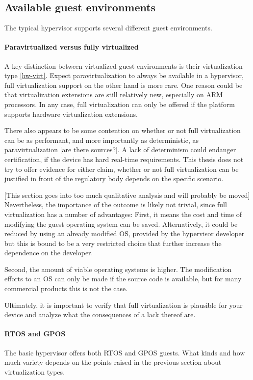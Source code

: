 \subsection{Available guest environments}
The typical hypervisor supports several different guest environments.
\paragraph{Paravirtualized versus fully virtualized}
A key distinction between virtualized guest environments is their virtualization type \ref{hw-virt}. Expect paravirtualization to always be available in a hypervisor, full virtualization support on the other hand is more rare. One reason could be that virtualization extensions are still relatively new, especially on ARM processors. In any case, full virtualization can only be offered if the platform supports hardware virtualization extensions.

There also appears to be some contention on whether or not full virtualization can be as performant, and more importantly as deterministic, as paravirtualization [are there sources?]. A lack of determinism could endanger certification, if the device has hard real-time requirements. This thesis does not try to offer evidence for either claim, whether or not full virtualization can be justified in front of the regulatory body depends on the specific scenario. 

[This section goes into too much qualitative analysis and will probably be moved] Nevertheless, the importance of the outcome is likely not trivial, since full virtualization has a number of advantages: First, it means the cost and time of modifying the guest operating system can be saved. Alternatively, it could be reduced by using an already modified \gls{OS}, provided by the hypervisor developer but this is bound to be a very restricted choice that further increase the dependence on the developer.

Second, the amount of viable operating systems is higher. The modification efforts to an \gls{OS} can only be made if the source code is available, but for many commercial products this is not the case. 

Ultimately, it is important to verify that full virtualization is plausible for your device and analyze what the consequences of a lack thereof are.
\paragraph{\gls{RTOS} and \gls{GPOS}}
The basic hypervisor offers both \gls{RTOS} and \gls{GPOS} guests. What kinds and how much variety depends on the points raised in the previous section about virtualization types. 
